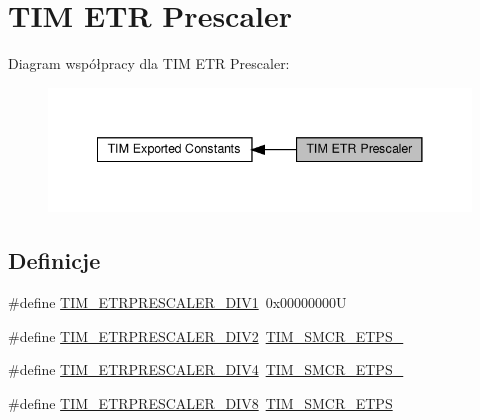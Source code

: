 \hypertarget{group___t_i_m___e_t_r___prescaler}{}\section{T\+IM E\+TR Prescaler}
\label{group___t_i_m___e_t_r___prescaler}
Diagram współpracy dla T\+IM E\+TR Prescaler\+:\nopagebreak
\begin{figure}[H]
\begin{center}
\leavevmode
\includegraphics[width=341pt]{group___t_i_m___e_t_r___prescaler}
\end{center}
\end{figure}
\subsection*{Definicje}
\begin{DoxyCompactItemize}
\item 
\#define \hyperlink{group___t_i_m___e_t_r___prescaler_gabead5364c62645592e42545ba09ab88a}{T\+I\+M\+\_\+\+E\+T\+R\+P\+R\+E\+S\+C\+A\+L\+E\+R\+\_\+\+D\+I\+V1}~0x00000000U
\item 
\#define \hyperlink{group___t_i_m___e_t_r___prescaler_gaf7fe49f67bdb6b33b9b41953fee75680}{T\+I\+M\+\_\+\+E\+T\+R\+P\+R\+E\+S\+C\+A\+L\+E\+R\+\_\+\+D\+I\+V2}~\hyperlink{group___peripheral___registers___bits___definition_ga00b43cd09557a69ed10471ed76b228d8}{T\+I\+M\+\_\+\+S\+M\+C\+R\+\_\+\+E\+T\+P\+S\+\_}
\item 
\#define \hyperlink{group___t_i_m___e_t_r___prescaler_gaa09da30c3cd28f1fe6b6f3f599a5212c}{T\+I\+M\+\_\+\+E\+T\+R\+P\+R\+E\+S\+C\+A\+L\+E\+R\+\_\+\+D\+I\+V4}~\hyperlink{group___peripheral___registers___bits___definition_gabf12f04862dbc92ca238d1518b27b16b}{T\+I\+M\+\_\+\+S\+M\+C\+R\+\_\+\+E\+T\+P\+S\+\_}
\item 
\#define \hyperlink{group___t_i_m___e_t_r___prescaler_ga834e38200874cced108379b17a24d0b7}{T\+I\+M\+\_\+\+E\+T\+R\+P\+R\+E\+S\+C\+A\+L\+E\+R\+\_\+\+D\+I\+V8}~\hyperlink{group___peripheral___registers___bits___definition_ga0ebb9e631876435e276211d88e797386}{T\+I\+M\+\_\+\+S\+M\+C\+R\+\_\+\+E\+T\+PS}
\end{DoxyCompactItemize}


